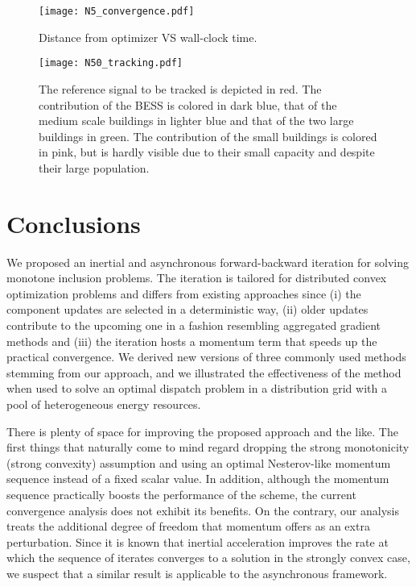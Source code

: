 \documentclass[envcountsect]{svjour3}
\begin{document}
\begin{figure}[!htb]
  \begin{center}
  \texttt{[image: N5\_convergence.pdf]}
  \caption{Distance from optimizer VS wall-clock time.}
  \label{fig::convergence}
  \end{center}
\end{figure}

\begin{figure}[!htb]
  \begin{center}
  \texttt{[image: N50\_tracking.pdf]}
  \caption{The reference signal to be tracked is depicted in red. The contribution of the BESS is colored in dark blue, that of the medium scale buildings in lighter blue and that of the two large buildings in green. The contribution of the small buildings is colored in pink, but is hardly visible due to their small capacity and despite their large population.}
  \label{fig::area}
  \end{center}
\end{figure}

\section{Conclusions}\label{sec::conclusions}
We proposed an inertial and asynchronous forward-backward iteration for solving monotone inclusion problems. The iteration is tailored for distributed convex optimization problems and differs from existing approaches since (i) the component updates are selected in a deterministic way, (ii) older updates contribute to the upcoming one in a fashion resembling aggregated gradient methods and (iii) the iteration hosts a momentum term that speeds up the practical convergence. We derived new versions of three commonly used methods stemming from our approach, and we illustrated the effectiveness of the method when used to solve an optimal dispatch problem in a distribution grid with a pool of heterogeneous energy resources.

There is plenty of space for improving the proposed approach and the like. The first things that naturally come to mind regard dropping the strong monotonicity (strong convexity) assumption and using an optimal Nesterov-like momentum sequence instead of a fixed scalar value. In addition, although the momentum sequence practically boosts the performance of the scheme, the current convergence analysis does not exhibit its benefits. On the contrary, our analysis treats the additional degree of freedom that momentum offers as an extra perturbation. Since it is known that inertial acceleration improves the rate at which the sequence of iterates converges to a solution in the strongly convex case, we suspect that a similar result is applicable to the asynchronous framework.
\end{document}

